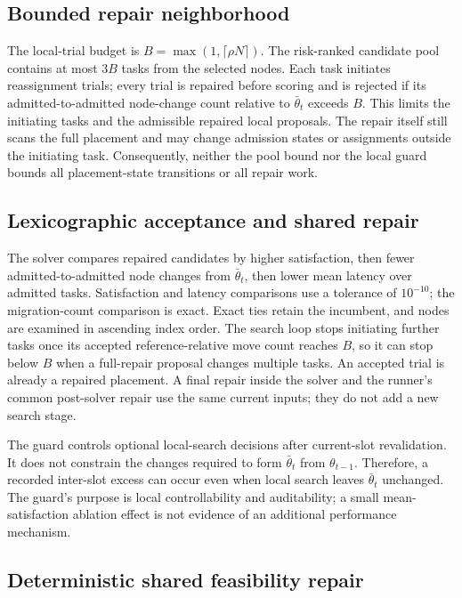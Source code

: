 \documentclass[preprint,12pt]{elsarticle}
\begin{document}
\subsection{Bounded repair neighborhood}\label{bounded-repair-neighborhood}

The local-trial budget is \(B=\max(1,\lceil\rho N\rceil)\).
The risk-ranked candidate pool contains at most \(3B\) tasks from the
selected nodes. Each task initiates reassignment trials; every trial is
repaired before scoring and is rejected if its admitted-to-admitted
node-change count relative to \(\bar\theta_t\) exceeds \(B\).
This limits the initiating tasks and the admissible repaired local
proposals. The repair itself still scans the full placement and may
change admission states or assignments outside the initiating task.
Consequently, neither the pool bound nor the local guard bounds all
placement-state transitions or all repair work.

\subsection{Lexicographic acceptance and shared repair}\label{lexicographic-acceptance-and-shared-repair}

The solver compares repaired candidates by higher satisfaction, then fewer
admitted-to-admitted node changes from \(\bar\theta_t\), then lower
mean latency over admitted tasks. Satisfaction and latency comparisons use
a tolerance of \(10^{-10}\); the migration-count comparison is exact.
Exact ties retain the incumbent, and nodes are examined in ascending index
order. The search loop stops initiating further tasks once its accepted
reference-relative move count reaches \(B\), so it can stop below \(B\)
when a full-repair proposal changes multiple tasks. An accepted trial is already a
repaired placement. A final repair inside the solver and the runner's
common post-solver repair use the same current inputs; they do not add a
new search stage.

The guard controls optional local-search decisions after current-slot
revalidation. It does not constrain the changes required to form
\(\bar\theta_t\) from \(\theta_{t-1}\). Therefore, a recorded
inter-slot excess can occur even when local search leaves
\(\bar\theta_t\) unchanged. The guard's purpose is local
controllability and auditability; a small mean-satisfaction ablation effect
is not evidence of an additional performance mechanism.

\subsection{Deterministic shared feasibility repair}\label{deterministic-shared-feasibility-repair}
\end{document}
